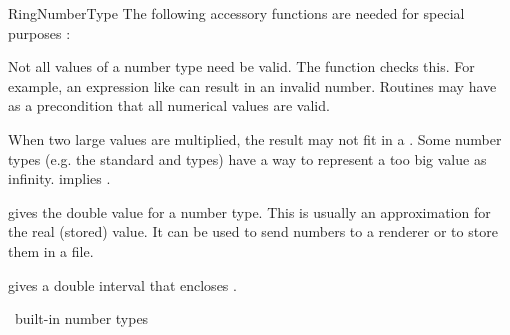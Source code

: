\begin{ccRefConcept}{RingNumberType}
The following accessory functions are needed for special purposes :

{Not all values of a number type need be valid. The function
 checks this. For example, an expression like
 can result in an invalid number. Routines may
have as a precondition that all numerical values are valid.}

{ When two large values are multiplied, the result may not fit in a
  . 
  Some number types (e.g. the standard  and  types)
  have a way to represent a too big value as infinity.
   implies .}

         {gives the double value for a number type.
          This is usually an approximation for the real (stored) value.
          It can be used to send numbers to a renderer or to store them 
          in a file.}

         {gives a double interval that encloses .}

\ccHasModels

\CC\ built-in number types \\
 \\
 \\
 \\
 \\
 \\
 \\
 \\
 \\
 \\
 \\
 \\

\ccSeeAlso
{} \\
 \\
 \\

\end{ccRefConcept}
